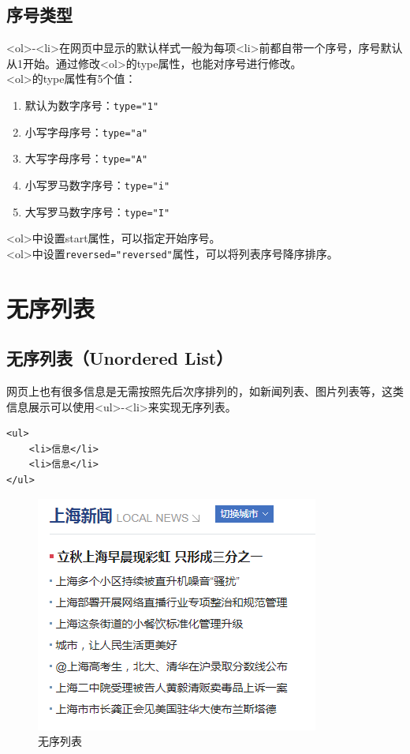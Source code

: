 \vspace{0.5cm}

\subsection{序号类型}

<ol>-<li>在网页中显示的默认样式一般为每项<li>前都自带一个序号，序号默认从1开始。通过修改<ol>的type属性，也能对序号进行修改。\\

<ol>的type属性有5个值：

\begin{enumerate}
	\item 默认为数字序号：\lstinline|type="1"|
	\item 小写字母序号：\lstinline|type="a"|
	\item 大写字母序号：\lstinline|type="A"|
	\item 小写罗马数字序号：\lstinline|type="i"|
	\item 大写罗马数字序号：\lstinline|type="I"|
\end{enumerate}

<ol>中设置start属性，可以指定开始序号。\\

<ol>中设置\lstinline|reversed="reversed"|属性，可以将列表序号降序排序。

\newpage

\section{无序列表}

\subsection{无序列表（Unordered List）}

网页上也有很多信息是无需按照先后次序排列的，如新闻列表、图片列表等，这类信息展示可以使用<ul>-<li>来实现无序列表。\\

\begin{lstlisting}[style=htmlcssjs]
<ul>
    <li>信息</li>
    <li>信息</li>
</ul>
\end{lstlisting}

\begin{figure}[H]
	\centering
	\includegraphics[scale=0.8]{img/C3/3-2/1.png}
	\caption{无序列表}
\end{figure}

